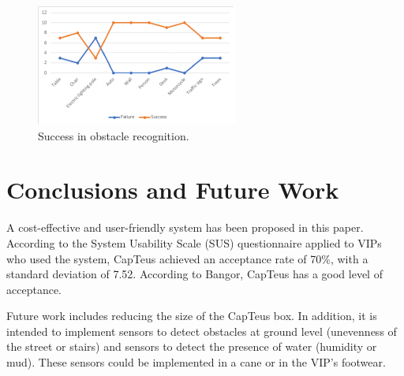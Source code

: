 \documentclass{svproc}
\begin{document}
\begin{figure}[h!]
	\includegraphics[scale=2]{fig5.pdf}
	\centering
	\caption{Success in obstacle recognition.}
	\label{fig:fig5}
\end{figure}

\section{Conclusions and Future Work}
A cost-effective and user-friendly system has been proposed in this paper. According
to the System Usability Scale (SUS) questionnaire applied to VIPs who
used the system, CapTeus achieved an acceptance rate of 70\%, with a standard
deviation of 7.52. According to Bangor, CapTeus has a good level of acceptance.

Future work includes reducing the size of the CapTeus box. In addition, it is
intended to implement sensors to detect obstacles at ground level (unevenness
of the street or stairs) and sensors to detect the presence of water (humidity or
mud). These sensors could be implemented in a cane or in the VIP’s footwear.
\end{document}
